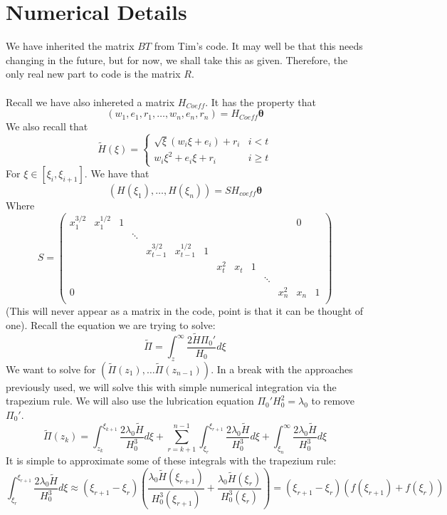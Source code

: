 \documentclass{article}
\newcommand{\bs}{\boldsymbol}                               %
\begin{document}
\section{Numerical Details}
We have inherited the matrix $BT$ from Tim's code. It may well be that this
needs changing in the future, but for now, we shall take this as given.
Therefore, the only real new part to code is the matrix $R$. 
\\
\\
Recall we have also inhereted a matrix $H_{Coeff}$. It has the property that
\[ ( w_1, e_1, r_1, \dots ,w_n, e_n, r_n ) = H_{Coeff} \bs{\theta} \]
We also recall that 
\[ \tilde{H}(\xi) = \left\{ \begin{array}{cc} \sqrt{\xi}(w_i\xi+e_i)+r_i &
i <t \\ w_i\xi^2+e_i\xi + r_i & i \geq t \end{array} \right. \]
For $\xi \in [\xi_i,\xi_{i+1}]$. We have that 
\[ (H(\xi_1), \dots, H(\xi_n) ) = S H_{coeff} \bs{\theta} \]
Where 
\[ S = \left( \begin{array}{*{14}{c}}
x_1^{3/2} & x_1^{1/2} & 1 & & & & & & & & & & 0 \\
 & & & \ddots \\
 & & & & x_{t-1}^{3/2} & x_{t-1}^{1/2} & 1 \\
 & & & & & & & x_{t}^{2} & x_{t} & 1 \\
 & & & & & & &  & & & \ddots \\
0 & & & & & & &  & & & &    x_{n}^{2} & x_{n} & 1 \\
\end{array} \right) \]
(This will never appear as a matrix in the code, point is that it can be
thought of one). Recall the equation we are trying to solve:
\[ \tilde{\Pi} = \int_z^{\infty} \frac{2 \tilde{H} \Pi_0'}{H_0} d\xi \]
We want to solve for $(\tilde{\Pi}(z_1), \dots \tilde{\Pi}(z_{n-1}))$.
In a break with the approaches previously used, we will solve this with
simple numerical integration via the trapezium rule. We will also use
the lubrication equation $\Pi_0'H_0^2=\lambda_0$ to remove $\Pi_0'$.
\[ \tilde{\Pi}(z_k) = \int_{z_k}^{\xi_{k+1}} \frac{2\lambda_0 \tilde{H}}{H_0^3} 
d\xi + \sum_{r=k+1}^{n-1}\int_{\xi_r}^{\xi_{r+1}} \frac{2\lambda_0 \tilde{H}}
{H_0^3} d\xi + \int_{\xi_n}^{\infty} \frac{2\lambda_0 \tilde{H}}
{H_0^3} d\xi\]
It is simple to approximate some of these integrals with the trapezium rule:
\[ \int_{\xi_r}^{\xi_{r+1}} \frac{2\lambda_0 \tilde{H}}{H_0^3} d\xi 
\approx (\xi_{r+1} - \xi_r)\left( \frac{\lambda_0\tilde{H}(\xi_{r+1})}
{H_0^3(\xi_{r+1})} + \frac{\lambda_0\tilde{H}(\xi_{r})}
{H_0^3(\xi_{r})} \right) =(\xi_{r+1} - \xi_r)(f(\xi_{r+1})+f(\xi_r)) \]
\end{document}
